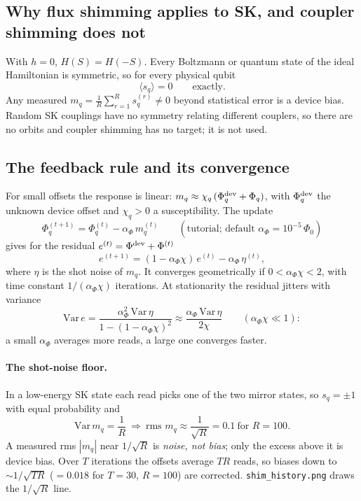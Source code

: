 \documentclass[11pt,a4paper]{article}
\newcommand{\code}[1]{\nolinkurl{#1}}
\begin{document}
\subsection{Why flux shimming applies to SK, and coupler shimming does not}
With $h=0$, $H(S)=H(-S)$. Every Boltzmann or quantum state of the ideal Hamiltonian is symmetric, so for every physical qubit
\begin{equation}
\langle s_q\rangle=0\qquad\text{exactly.}
\end{equation}
Any measured $m_q=\frac1R\sum_{r=1}^R s_q^{(r)}\neq0$ beyond statistical error is a device bias. Random SK couplings have no symmetry relating different couplers, so there are no orbits and coupler shimming has no target; it is not used.

\subsection{The feedback rule and its convergence}
For small offsets the response is linear: $m_q\approx\chi_q\,(\Phi^{\rm dev}_q+\Phi_q)$, with $\Phi^{\rm dev}_q$ the unknown device offset and $\chi_q>0$ a susceptibility. The update
\begin{equation}
\Phi_q^{(t+1)}=\Phi_q^{(t)}-\alpha_\Phi\,m_q^{(t)}\qquad(\text{tutorial; default }\alpha_\Phi=10^{-5}\,\Phi_0)
\end{equation}
gives for the residual $e^{(t)}=\Phi^{\rm dev}+\Phi^{(t)}$
\begin{equation}
e^{(t+1)}=(1-\alpha_\Phi\chi)\,e^{(t)}-\alpha_\Phi\,\eta^{(t)},
\end{equation}
where $\eta$ is the shot noise of $m_q$. It converges geometrically if $0<\alpha_\Phi\chi<2$, with time constant $1/(\alpha_\Phi\chi)$ iterations. At stationarity the residual jitters with variance
\begin{equation}
\mathrm{Var}\,e=\frac{\alpha_\Phi^2\,\mathrm{Var}\,\eta}{1-(1-\alpha_\Phi\chi)^2}\approx\frac{\alpha_\Phi\,\mathrm{Var}\,\eta}{2\chi}\qquad(\alpha_\Phi\chi\ll1):
\end{equation}
a small $\alpha_\Phi$ averages more reads, a large one converges faster.

\paragraph{The shot-noise floor.} In a low-energy SK state each read picks one of the two mirror states, so $s_q=\pm1$ with equal probability and
\begin{equation}
\mathrm{Var}\,m_q=\frac1R\ \Longrightarrow\ \text{rms }m_q\approx\frac{1}{\sqrt R}=0.1\ \text{for }R=100 .
\end{equation}
A measured rms $|m_q|$ near $1/\sqrt R$ is \emph{noise, not bias}; only the excess above it is device bias. Over $T$ iterations the offsets average $TR$ reads, so biases down to $\sim1/\sqrt{TR}$ ($=0.018$ for $T=30$, $R=100$) are corrected. \code{shim_history.png} draws the $1/\sqrt R$ line.
\end{document}
